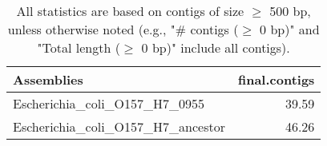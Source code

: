 \documentclass[12pt,a4paper]{article}
\begin{document}
\begin{table}[ht]
\begin{center}
\caption{All statistics are based on contigs of size $\geq$ 500 bp, unless otherwise noted (e.g., "\# contigs ($\geq$ 0 bp)" and "Total length ($\geq$ 0 bp)" include all contigs).}
\begin{tabular}{|l*{1}{|r}|}
\hline
Assemblies & final.contigs \\ \hline
Escherichia\_coli\_O157\_H7\_0955 & 39.59 \\ \hline
Escherichia\_coli\_O157\_H7\_ancestor & 46.26 \\ \hline
\end{tabular}
\end{center}
\end{table}
\end{document}
